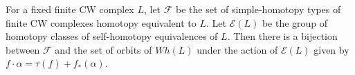 For a fixed finite CW complex $L$, let $\mathcal{F}$ be the set of simple-homotopy types of finite CW complexes homotopy equivalent to $L$. Let $\mathcal{E}(L)$ be the group of homotopy classes of self-homotopy equivalences of $L$. Then there is a bijection between $\mathcal{F}$ and the set of orbits of $Wh(L)$ under the action of $\mathcal{E}(L)$ given by $f \cdot \alpha = \tau(f) + f_*(\alpha)$.
